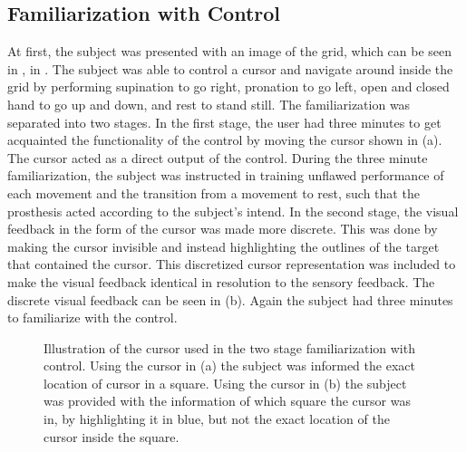 \subsection{Familiarization with Control} \label{sec:meth:contrain}

At first, the subject was presented with an image of the grid, which can be seen in , in . The subject was able to control a cursor and navigate around inside the grid by performing supination to go right, pronation to go left, open and closed hand to go up and down, and rest to stand still. The familiarization was separated into two stages. In the first stage, the user had three minutes to get acquainted the functionality of the control by moving the cursor shown in  (a). The cursor acted as a direct output of the control. During the three minute familiarization, the subject was instructed in training unflawed performance of each movement and the transition from a movement to rest, such that the prosthesis acted according to the subject's intend. In the second stage, the visual feedback in the form of the cursor was made more discrete. This was done by making the cursor invisible and instead highlighting the outlines of the target that contained the cursor. This discretized cursor representation was included to make the visual feedback identical in resolution to the sensory feedback. The discrete visual feedback can be seen in  (b). Again the subject had three minutes to familiarize with the control. 

\begin{figure}[H]
	\hspace{0.9cm}
	\caption{Illustration of the cursor used in the two stage familiarization with control.  Using the cursor in (a) the subject was informed the exact location of cursor in a square. Using the cursor in (b) the subject was provided with the information of which square the cursor was in, by highlighting it in blue, but not the exact location of the cursor inside the square. }
	\label{fig:C1}
\end{figure}

